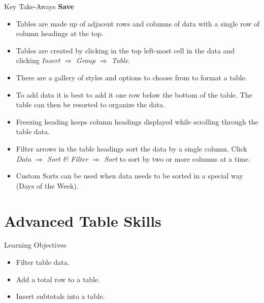 \begin{center}
	\begin{tkwbox}{Key Take-Aways}
		\textbf{Save}
		\\
		\begin{itemize}
			\setlength{\itemsep}{0pt}
			\setlength{\parskip}{0pt}
			\setlength{\parsep}{0pt}

			\item Tables are made up of adjacent rows and columns of data with a single row of column headings at the top.
			\item Tables are created by clicking in the top left-most cell in the data and clicking \textit{Insert $ \Rightarrow $ Group $ \Rightarrow $ Table}.
			\item There are a gallery of styles and options to choose from to format a table.
			\item To add data it is best to add it one row below the bottom of the table. The table can then be resorted to organize the data.
			\item Freezing heading keeps column headings displayed while scrolling through the table data.
			\item Filter arrows in the table headings sort the data by a single column. Click \textit{Data $ \Rightarrow $ Sort \& Filter $ \Rightarrow $ Sort} to sort by two or more columns at a time.
			\item Custom Sorts can be used when data needs to be sorted in a special way (\ie Days of the Week).
			
		\end{itemize}
	\end{tkwbox}
\end{center}

\section{Advanced Table Skills}

\begin{center}
	\begin{objbox}{Learning Objectives}
		\begin{itemize}
			\setlength{\itemsep}{0pt}
			\setlength{\parskip}{0pt}
			\setlength{\parsep}{0pt}

			\item Filter table data.
			\item Add a total row to a table.
			\item Insert subtotals into a table.
			
		\end{itemize}
	\end{objbox}
\end{center}

